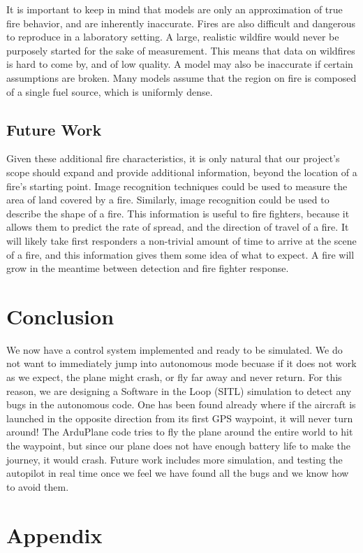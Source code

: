 \documentclass[12pt,journal,compsoc]{IEEEtran}
\begin{document}
It is important to keep in mind that models are only an approximation of true fire behavior, and are inherently inaccurate. Fires are also difficult and dangerous to reproduce in a laboratory setting. A large, realistic wildfire would never be purposely started for the sake of measurement. This means that data on wildfires is hard to come by, and of low quality. A model may also be inaccurate if certain assumptions are broken. Many models assume that the region on fire is composed of a single fuel source, which is uniformly dense.

\subsection{Future Work}
Given these additional fire characteristics, it is only natural that our project's scope should expand and provide additional information, beyond the location of a fire's starting point. Image recognition techniques could be used to measure the area of land covered by a fire. Similarly, image recognition could be used to describe the shape of a fire. This information is useful to fire fighters, because it allows them to predict the rate of spread, and the direction of travel of a fire. It will likely take first responders a non-trivial amount of time to arrive at the scene of a fire, and this information gives them some idea of what to expect. A fire will grow in the meantime between detection and fire fighter response.  

\section{Conclusion}
We now have a control system implemented and ready to be simulated. We do not want to immediately jump into autonomous mode becuase if it does not work as we expect, the plane might crash, or fly far away and never return. For this reason, we are designing a Software in the Loop (SITL) simulation to detect any bugs in the autonomous code. One has been found already where if the aircraft is launched in the opposite direction from its first GPS waypoint, it will never turn around! The ArduPlane code tries to fly the plane around the entire world to hit the waypoint, but since our plane does not have enough battery life to make the journey, it would crash. Future work includes more simulation, and testing the autopilot in real time once we feel we have found all the bugs and we know how to avoid them.

\appendices
\section*{Appendix}
\end{document}

